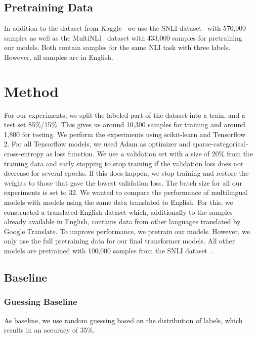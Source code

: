 \documentclass[acmsmall,nonacm]{acmart}
\begin{document}
\subsection{Pretraining Data}
In addition to the dataset from Kaggle~\cite{kaggle-dataset} we use the SNLI dataset~\cite{snli-bowman2015} with 570,000 samples as well as the MultiNLI~\cite{mlni-N18-1101} dataset with 433,000 samples for pretraining our models. Both contain samples for the same NLI task with three labels. However, all samples are in English.

\section{Method}
For our experiments, we split the labeled part of the dataset into a train, and a test set 85\%/15\%. This gives us around 10,300 samples for training and around 1,800 for testing. We perform the experiments using scikit-learn and Tensorflow 2.
For all Tensorflow models, we used Adam as optimizer and sparse-categorical-cross-entropy as loss function. We use a validation set with a size of 20\% from the training data and early stopping to stop training if the validation loss does not decrease for several epochs.
If this does happen, we stop training and restore the weights to those that gave the lowest validation loss. The batch size for all our experiments is set to 32. 
We wanted to compare the performance of multilingual models with models using the same data translated to English. For this, we constructed a translated-English dataset which, additionally to the samples already available in English, contains data from other languages translated by Google Translate. 
To improve performance, we pretrain our models. However, we only use the full pretraining data for our final transformer models. All other models are pretrained with 100,000 samples from the SNLI dataset~\cite{snli-bowman2015}.

\subsection{Baseline}

\subsubsection{Guessing Baseline}
As baseline, we use random guessing based on the distribution of labels, which results in an accuracy of 35\%. 
\end{document}
